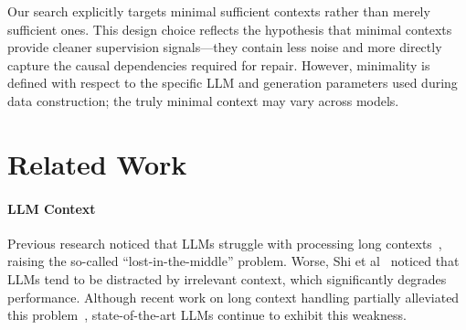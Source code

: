 \documentclass[sigconf,nonacm]{acmart}
\newcommand{\sergey}[1]{{\color{red}\textbf{(Sergey:} #1\textbf{)}}}
\begin{document}
Our search explicitly targets minimal sufficient contexts rather than merely sufficient ones. This design choice reflects the hypothesis that minimal contexts provide cleaner supervision signals---they contain less noise and more directly capture the causal dependencies required for repair. However, minimality is defined with respect to the specific LLM and generation parameters used during data construction; the truly minimal context may vary across models.





\section{Related Work}

\paragraph*{LLM Context} Previous research noticed that LLMs struggle with processing long contexts~\cite{liu2024lost,li2024loogle}, raising the so-called ``lost-in-the-middle'' problem. Worse, Shi et al~\cite{shi2023large} noticed that LLMs tend to be distracted by irrelevant context, which significantly degrades performance. Although recent work on long context handling partially alleviated this problem~\cite{zhang2025recursive}, state-of-the-art LLMs continue to exhibit this weakness.
\end{document}
